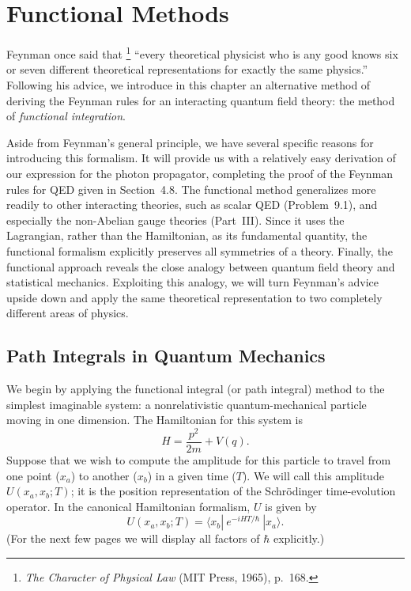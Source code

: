 \chapter{Functional Methods}

Feynman once said that%
\footnote{\emph{The Character of Physical Law} (MIT Press, 1965), p.~168.}
``every theoretical physicist who is any good knows six or seven different
theoretical representations for exactly the same physics.''  Following his
advice, we introduce in this chapter an alternative method of deriving the
Feynman rules for an interacting quantum field theory: the method of
\emph{functional integration}.

Aside from Feynman's general principle, we have several specific reasons for
introducing this formalism.  It will provide us with a relatively easy
derivation of our expression for the photon propagator, completing the proof
of the Feynman rules for QED given in Section~4.8.  The functional method
generalizes more readily to other interacting theories, such as scalar QED
(Problem~9.1), and especially the non-Abelian gauge theories (Part~III).
Since it uses the Lagrangian, rather than the Hamiltonian, as its fundamental
quantity, the functional formalism explicitly preserves all symmetries of a
theory.  Finally, the functional approach reveals the close analogy between
quantum field theory and statistical mechanics.  Exploiting this analogy, we
will turn Feynman's advice upside down and apply the same theoretical
representation to two completely different areas of physics.

\section{Path Integrals in Quantum Mechanics}

We begin by applying the functional integral (or path integral) method to the
simplest imaginable system: a nonrelativistic quantum-mechanical particle
moving in one dimension.  The Hamiltonian for this system is
\begin{equation}
  H = \frac{p^2}{2m} + V(q) .
\end{equation}
Suppose that we wish to compute the amplitude for this particle to travel from
one point ($x_a$) to another ($x_b$) in a given time ($T$).  We will call this
amplitude $U(x_a, x_b; T)$; it is the position representation of the
Schr\"odinger time-evolution operator.  In the canonical Hamiltonian
formalism, $U$ is given by
\begin{equation}
  U(x_a, x_b; T) = \langle x_b|\ e^{-iHT/\hbar}\ |x_a\rangle .
  \label{eq:9.1}
\end{equation}
(For the next few pages we will display all factors of $\hbar$ explicitly.)

